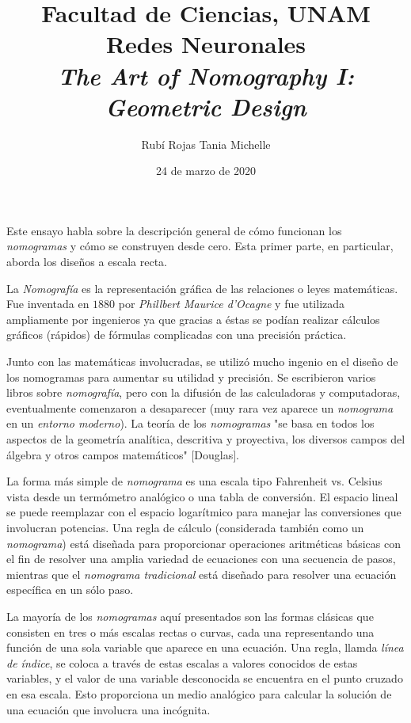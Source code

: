 \documentclass[letterpaper,11pt]{article}
\title{Facultad de Ciencias, UNAM \\ Redes Neuronales \\ 
       \textit{The Art of Nomography I: Geometric Design}}
\author{Rubí Rojas Tania Michelle}
\date{24 de marzo de 2020}
\begin{document}
\maketitle
Este ensayo habla sobre la descripción general de cómo funcionan los
\textit{nomogramas} y cómo se construyen desde cero. Esta primer parte, en 
particular, aborda los diseños a escala recta. 

La \textit{Nomografía} es la representación gráfica de las relaciones o leyes
matemáticas. Fue inventada en $1880$ por \textit{Phillbert Maurice d'Ocagne} y
fue utilizada ampliamente por ingenieros ya que gracias a éstas se podían 
realizar cálculos gráficos (rápidos) de fórmulas complicadas con una precisión 
práctica. 

Junto con las matemáticas involucradas, se utilizó mucho ingenio en el diseño
de los nomogramas para aumentar su utilidad y precisión. Se escribieron varios
libros sobre \textit{nomografía}, pero con la difusión de las calculadoras y 
computadoras, eventualmente comenzaron a desaparecer (muy rara vez aparece un 
\textit{nomograma} en un \textit{entorno moderno}). La teoría de los 
\textit{nomogramas} "se basa en todos los aspectos de la geometría analítica,
descritiva y proyectiva, los diversos campos del álgebra y otros campos 
matemáticos" $[$Douglas$]$.

La forma más simple de \textit{nomograma} es una escala tipo Fahrenheit vs. 
Celsius vista desde un termómetro analógico o una tabla de conversión. El 
espacio lineal se puede reemplazar con el espacio logarítmico para manejar las
conversiones que involucran potencias. Una regla de cálculo (considerada también
como un \textit{nomograma}) está diseñada para proporcionar operaciones 
aritméticas básicas con el fin de resolver una amplia variedad de ecuaciones 
con una secuencia de pasos, mientras que el \textit{nomograma tradicional} está 
diseñado para resolver una ecuación específica en un sólo paso. 

La mayoría de los \textit{nomogramas} aquí presentados son las formas clásicas
que consisten en tres o más escalas rectas o curvas, cada una representando una 
función de una sola variable que aparece en una ecuación. Una regla, llamda 
\textit{línea de índice}, se coloca a través de estas escalas a valores 
conocidos de estas variables, y el valor de una variable desconocida se 
encuentra en el punto cruzado en esa escala. Esto proporciona un medio analógico
para calcular la solución de una ecuación que involucra una incógnita.
\end{document}
